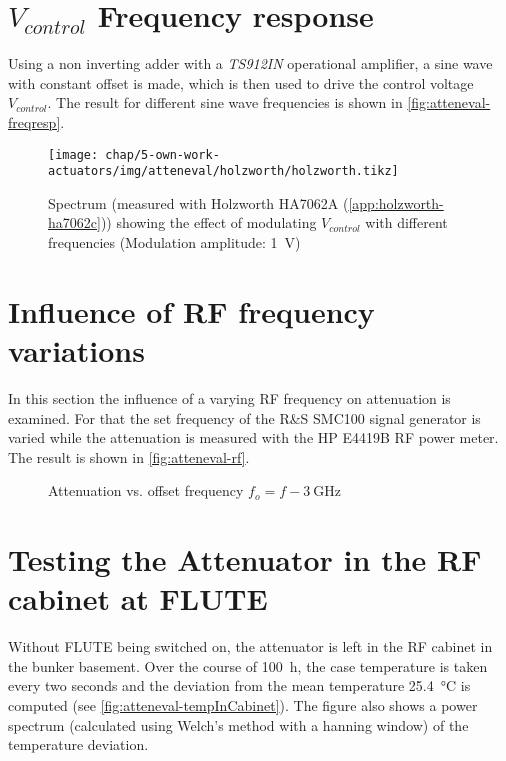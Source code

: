 \FloatBarrier
\newpage
\section{$V_{control}$ Frequency response}
Using a non inverting adder with a \textit{TS912IN} operational amplifier, a sine wave with constant offset is made, which is then used to drive the control voltage $V_{control}$. The result for different sine wave frequencies is shown in \autoref{fig:atteneval-freqresp}.

\begin{figure}[tb]
	\centering
	\texttt{[image: chap/5-own-work-actuators/img/atteneval/holzworth/holzworth.tikz]}
	\caption{Spectrum (measured with Holzworth HA7062A (\autoref{app:holzworth-ha7062c})) showing the effect of modulating $V_{control}$ with different frequencies (Modulation amplitude: \SI{1}{\volt})}
	\label{fig:atteneval-freqresp}
\end{figure}

\FloatBarrier
\newpage
\section{Influence of RF frequency variations}
In this section the influence of a varying RF frequency on attenuation is examined. For that the set frequency of the R\&S SMC100 signal generator is varied while the attenuation is measured with the HP E4419B RF power meter. The result is shown in \autoref{fig:atteneval-rf}.
\begin{figure}[tb]
    \centering
        \subfloat[$f_o=\SI{+-30}{\kHz}$]{}
        \qquad
        \subfloat[$f_o=\SI{+-1}{\kHz}$]{}
       \caption{Attenuation vs. offset frequency $f_o=f-\SI{3}{\GHz}$}
    \label{fig:atteneval-rf}
\end{figure}

\FloatBarrier
\section{Testing the Attenuator in the RF cabinet at FLUTE}
Without FLUTE being switched on, the attenuator is left in the RF cabinet in the bunker basement. Over the course of \SI{100}{\hour}, the case temperature is taken every two seconds and the deviation from the mean temperature \SI{25.4}{\degreeCelsius} is computed (see \autoref{fig:atteneval-tempInCabinet}). The figure also shows a power spectrum (calculated using Welch's method with a hanning window) of the temperature deviation.


